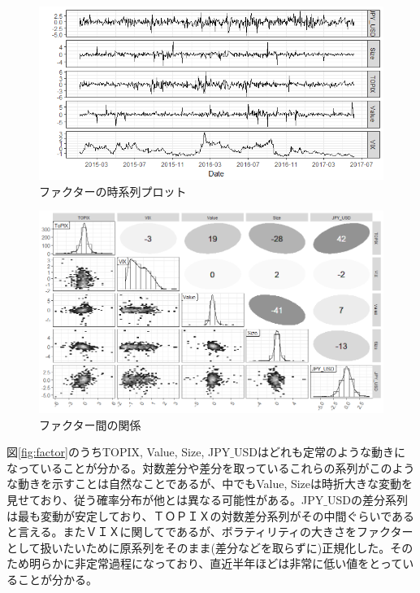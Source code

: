 \documentclass[11pt]{jreport}
\begin{document}
\begin{figure}[H]
	\begin{center}
		\includegraphics[width=15cm]{./fig/factor_plot.png}
		\caption{ファクターの時系列プロット}
		\label{fig:factor_plot}
	\end{center}
\end{figure}

\begin{figure}[H]
	\begin{center}
		\includegraphics[width=15cm]{./fig/factor_cor.png}
		\caption{ファクター間の関係}
		\label{fig:factor_cor}
	\end{center}
\end{figure}

図\ref{fig:factor}のうちTOPIX, Value, Size, JPY$\_$USDはどれも定常のような動きになっていることが分かる。対数差分や差分を取っているこれらの系列がこのような動きを示すことは自然なことであるが、中でもValue, Sizeは時折大きな変動を見せており、従う確率分布が他とは異なる可能性がある。JPY$\_$USDの差分系列は最も変動が安定しており、ＴＯＰＩＸの対数差分系列がその中間ぐらいであると言える。またＶＩＸに関してであるが、ボラティリティの大きさをファクターとして扱いたいために原系列をそのまま(差分などを取らずに)正規化した。そのため明らかに非定常過程になっており、直近半年ほどは非常に低い値をとっていることが分かる。
\end{document}
